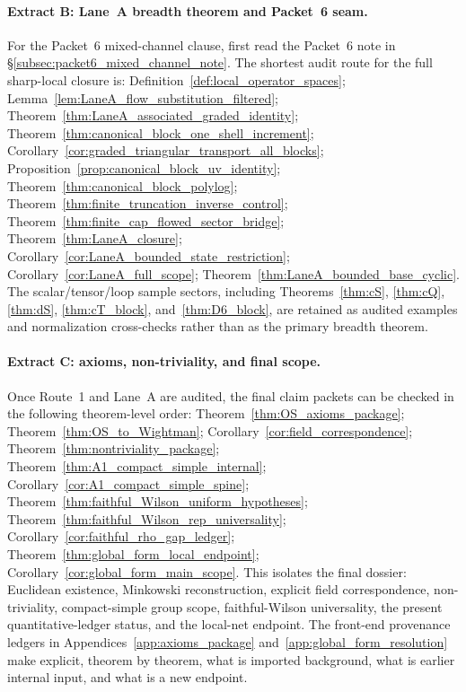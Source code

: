 \paragraph{Extract B: Lane~A breadth theorem and Packet~6 seam.}
For the Packet~6 mixed-channel clause, first read the Packet~6 note in \S\ref{subsec:packet6_mixed_channel_note}.
The shortest audit route for the full sharp-local closure is:
Definition~\ref{def:local_operator_spaces};
Lemma~\ref{lem:LaneA_flow_substitution_filtered};
Theorem~\ref{thm:LaneA_associated_graded_identity};
Theorem~\ref{thm:canonical_block_one_shell_increment};
Corollary~\ref{cor:graded_triangular_transport_all_blocks};
Proposition~\ref{prop:canonical_block_uv_identity};
Theorem~\ref{thm:canonical_block_polylog};
Theorem~\ref{thm:finite_truncation_inverse_control};
Theorem~\ref{thm:finite_cap_flowed_sector_bridge};
Theorem~\ref{thm:LaneA_closure};
Corollary~\ref{cor:LaneA_bounded_state_restriction};
Corollary~\ref{cor:LaneA_full_scope};
Theorem~\ref{thm:LaneA_bounded_base_cyclic}.
The scalar/tensor/loop sample sectors, including Theorems~\ref{thm:cS}, \ref{thm:cQ}, \ref{thm:dS}, \ref{thm:cT_block}, and~\ref{thm:D6_block}, are retained as audited examples and normalization cross-checks rather than as the primary breadth theorem.

\paragraph{Extract C: axioms, non-triviality, and final scope.}
Once Route~1 and Lane~A are audited, the final claim packets can be checked in the following theorem-level order:
Theorem~\ref{thm:OS_axioms_package};
Theorem~\ref{thm:OS_to_Wightman};
Corollary~\ref{cor:field_correspondence};
Theorem~\ref{thm:nontriviality_package};
Theorem~\ref{thm:A1_compact_simple_internal};
Corollary~\ref{cor:A1_compact_simple_spine};
Theorem~\ref{thm:faithful_Wilson_uniform_hypotheses};
Theorem~\ref{thm:faithful_Wilson_rep_universality};
Corollary~\ref{cor:faithful_rho_gap_ledger};
Theorem~\ref{thm:global_form_local_endpoint};
Corollary~\ref{cor:global_form_main_scope}.
This isolates the final dossier: Euclidean existence, Minkowski reconstruction, explicit field correspondence, non-triviality, compact-simple group scope, faithful-Wilson universality, the present quantitative-ledger status, and the local-net endpoint. The front-end provenance ledgers in Appendices~\ref{app:axioms_package} and~\ref{app:global_form_resolution} make explicit, theorem by theorem, what is imported background, what is earlier internal input, and what is a new endpoint.

